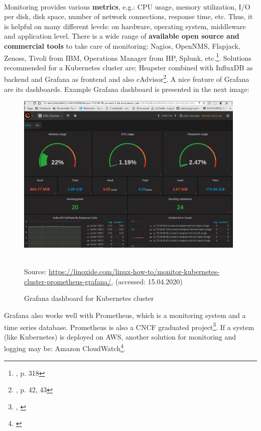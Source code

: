 \paragraph{}
Monitoring provides various \textbf{metrics}, e.g.: CPU usage, memory utilization, I/O per disk, disk space, number of network connections, response time, etc. Thus, it is helpful on many different levels: on hardware, operating system,  middleware and application level. There is a wide range of \textbf{available open source and commercial tools} to take care of monitoring: Nagios, OpenNMS, Flapjack, Zenoss, Tivoli from IBM, Operations Manager from HP, Splunk, etc.\footnote{\cite{book-cicd}, p. 318}. Solutions recommended for a Kubernetes cluster are: Heapster combined with InfluxDB as backend and Grafana as frontend and also cAdvisor\footnote{\cite{book-mastering-k8s}, p. 42, 43}. A nice feature of Grafana are its dashboards. Example Grafana dashboard is presented in the next image:
\begin{figure}[H]
  \centering
  \includegraphics[width=11cm]{figures/grafana.png}
  \label{fig:grafana}
  \caption{Grafana dashboard for Kubernetes cluster}
  \\
  \small{Source: \url{https://linoxide.com/linux-how-to/monitor-kubernetes-cluster-prometheus-grafana/}, (accessed: 15.04.2020)}
\end{figure}
Grafana also works well with Prometheus, which is a monitoring system and a time series database. Prometheus is also a CNCF graduated project\footnote{\cite{online-prometheus-gh}, \cite{online-prometheus-www}}. If a system (like Kubernetes) is deployed on AWS, another solution for monitoring and logging may be: Amazon CloudWatch\footnote{\cite{online-cw}}.

